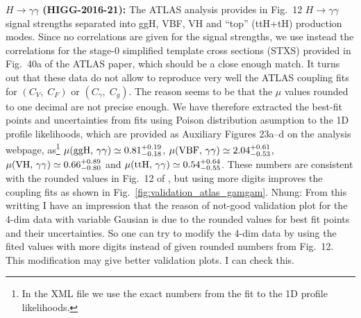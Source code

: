 {\bf\boldmath $H\to\gamma\gamma$ (HIGG-2016-21):}  
The ATLAS analysis \cite{Aaboud:2018xdt} provides in Fig.~12 $H\to\gamma\gamma$ signal strengths separated into   
ggH, VBF, VH and ``top'' (ttH+tH) production modes. Since no correlations are given for the signal strengths, we 
use instead the correlations for the stage-0 simplified template cross sections (STXS) provided in Fig.~40a of the ATLAS 
paper, which should be a close enough match. It turns out that these data do not allow to reproduce very well the 
ATLAS coupling fits for $(C_V,\;C_F)$ or $(C_\gamma,\;C_g)$. The reason seems to be that the $\mu$ values 
rounded to one decimal are not  precise enough. We have therefore extracted the best-fit points and uncertainties 
from fits  {\nhung using Poison distribution asumption} to the 1D profile likelihoods, which are provided as Auxiliary Figures 23a--d on the analysis webpage, as\footnote{In the XML file we use the exact numbers from the fit to the 1D profile likelihoods.}  
$\mu({\rm ggH},\,\gamma\gamma)\simeq 0.81^{+0.19}_{-0.18}$, 
$\mu({\rm VBF},\,\gamma\gamma)\simeq 2.04^{+0.61}_{-0.53}$, 
$\mu({\rm VH},\,\gamma\gamma)\simeq 0.66^{+0.89}_{-0.80}$ and 
$\mu({\rm ttH},\,\gamma\gamma)\simeq 0.54^{+0.64}_{-0.55}$.   
These numbers are consistent with the rounded values in Fig.~12 of \cite{Aaboud:2018xdt}, but using more digits 
improves the coupling fits as shown in Fig.~\ref{fig:validation_atlas_gamgam}. {\nhung Nhung: From this writting I have an impression
that the reason of not-good validation plot for the 4-dim data with variable Gausian is due to the rounded values for best fit points
and their uncertainties. So one can try to modify the  4-dim data by using the fited values with more digits instead of given rounded numbers from Fig.~12. This modification may give better validation plots. I can check this.  }

